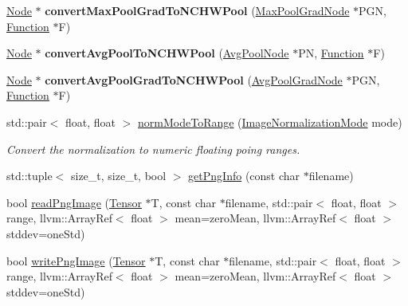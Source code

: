 \begin{DoxyCompactItemize}
\mbox{\label{namespaceglow_a2f2b1618bc713e16d13254ae32174ea5}} 
\hyperlink{classglow_1_1_node}{Node} $\ast$ {\bfseries convert\+Max\+Pool\+Grad\+To\+N\+C\+H\+W\+Pool} (\hyperlink{classglow_1_1_max_pool_grad_node}{Max\+Pool\+Grad\+Node} $\ast$P\+GN, \hyperlink{classglow_1_1_function}{Function} $\ast$F)
\item 
\mbox{\label{namespaceglow_a6f8026f99cd2e11a8470cd308c4ee9fb}} 
\hyperlink{classglow_1_1_node}{Node} $\ast$ {\bfseries convert\+Avg\+Pool\+To\+N\+C\+H\+W\+Pool} (\hyperlink{classglow_1_1_avg_pool_node}{Avg\+Pool\+Node} $\ast$PN, \hyperlink{classglow_1_1_function}{Function} $\ast$F)
\item 
\mbox{\label{namespaceglow_acde6a998376eec40dbaaa3f5c0678dfa}} 
\hyperlink{classglow_1_1_node}{Node} $\ast$ {\bfseries convert\+Avg\+Pool\+Grad\+To\+N\+C\+H\+W\+Pool} (\hyperlink{classglow_1_1_avg_pool_grad_node}{Avg\+Pool\+Grad\+Node} $\ast$P\+GN, \hyperlink{classglow_1_1_function}{Function} $\ast$F)
\item 
std\+::pair$<$ float, float $>$ \hyperlink{namespaceglow_a300f3c7eeb3e5ee04d177a2acc6ac4db}{norm\+Mode\+To\+Range} (\hyperlink{namespaceglow_af836699afb1d36a88df0d50d74fde931}{Image\+Normalization\+Mode} mode)
\begin{DoxyCompactList}\small\item\em Convert the normalization to numeric floating poing ranges. \end{DoxyCompactList}\item 
std\+::tuple$<$ size\+\_\+t, size\+\_\+t, bool $>$ \hyperlink{namespaceglow_a8a01d4f862cb83ad8979bfa1c5794930}{get\+Png\+Info} (const char $\ast$filename)
\item 
bool \hyperlink{namespaceglow_a23bf5dcbdf3e69fcee124d73bc4ecace}{read\+Png\+Image} (\hyperlink{classglow_1_1_tensor}{Tensor} $\ast$T, const char $\ast$filename, std\+::pair$<$ float, float $>$ range, llvm\+::\+Array\+Ref$<$ float $>$ mean=zero\+Mean, llvm\+::\+Array\+Ref$<$ float $>$ stddev=one\+Std)
\item 
bool \hyperlink{namespaceglow_acfb0a7a5b75a41f5ba57843e7f242338}{write\+Png\+Image} (\hyperlink{classglow_1_1_tensor}{Tensor} $\ast$T, const char $\ast$filename, std\+::pair$<$ float, float $>$ range, llvm\+::\+Array\+Ref$<$ float $>$ mean=zero\+Mean, llvm\+::\+Array\+Ref$<$ float $>$ stddev=one\+Std)
\item 

\end{DoxyCompactItemize}
